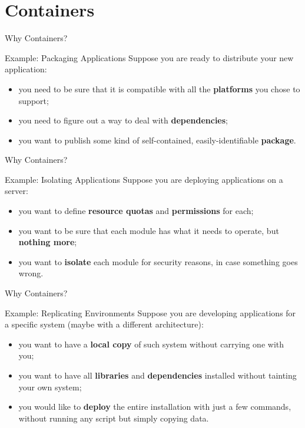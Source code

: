
\section{Containers}
\graphicspath{{figs/section1/}}

\begin{frame}{Why Containers?}
\begin{exampleblock}{Example: Packaging Applications}
  Suppose you are ready to distribute your new application:
  \begin{itemize}
    \item you need to be sure that it is compatible with all the \textbf{platforms} you chose to support;
    \item you need to figure out a way to deal with \textbf{dependencies};
    \item you want to publish some kind of self-contained, easily-identifiable \textbf{package}.
  \end{itemize}
\end{exampleblock}
\end{frame}
\begin{frame}{Why Containers?}
\begin{exampleblock}{Example: Isolating Applications}
  Suppose you are deploying applications on a server:
  \begin{itemize}
    \item you want to define \textbf{resource quotas} and \textbf{permissions} for each;
    \item you want to be sure that each module has what it needs to operate, but \textbf{nothing more};
    \item you want to \textbf{isolate} each module for security reasons, in case something goes wrong.
  \end{itemize}
\end{exampleblock}
\end{frame}
\begin{frame}{Why Containers?}
\begin{exampleblock}{Example: Replicating Environments}
  Suppose you are developing applications for a specific system (maybe with a different architecture):
  \begin{itemize}
    \item you want to have a \textbf{local copy} of such system without carrying one with you;
    \item you want to have all \textbf{libraries} and \textbf{dependencies} installed without tainting your own system;
    \item you would like to \textbf{deploy} the entire installation with just a few commands, without running any script but simply copying data.
  \end{itemize}
\end{exampleblock}
\end{frame}
